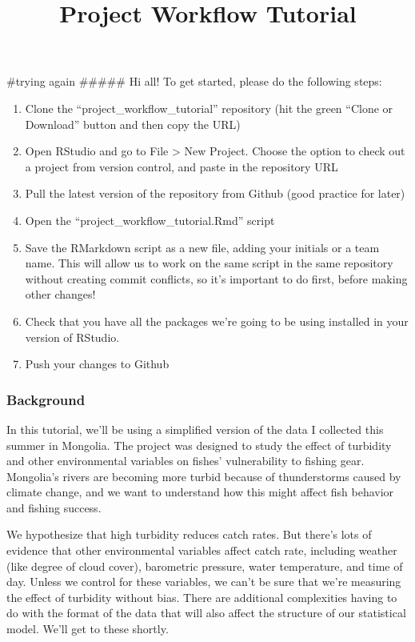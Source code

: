 \documentclass[]{article}
\title{Project Workflow Tutorial}
\author{}
\date{}
\providecommand{\tightlist}{%
  \setlength{\itemsep}{0pt}\setlength{\parskip}{0pt}}
\begin{document}
\maketitle

\#trying again \#\#\#\#\# Hi all! To get started, please do the
following steps:

\begin{enumerate}
\def\labelenumi{\arabic{enumi}.}
\tightlist
\item
  Clone the ``project\_workflow\_tutorial'' repository (hit the green
  ``Clone or Download'' button and then copy the URL)
\item
  Open RStudio and go to File \textgreater{} New Project. Choose the
  option to check out a project from version control, and paste in the
  repository URL
\item
  Pull the latest version of the repository from Github (good practice
  for later)
\item
  Open the ``project\_workflow\_tutorial.Rmd'' script
\item
  Save the RMarkdown script as a new file, adding your initials or a
  team name. This will allow us to work on the same script in the same
  repository without creating commit conflicts, so it's important to do
  first, before making other changes!
\item
  Check that you have all the packages we're going to be using installed
  in your version of RStudio.
\item
  Push your changes to Github
\end{enumerate}

\hypertarget{background}{%
\subsubsection{Background}\label{background}}

In this tutorial, we'll be using a simplified version of the data I
collected this summer in Mongolia. The project was designed to study the
effect of turbidity and other environmental variables on fishes'
vulnerability to fishing gear. Mongolia's rivers are becoming more
turbid because of thunderstorms caused by climate change, and we want to
understand how this might affect fish behavior and fishing success.

We hypothesize that high turbidity reduces catch rates. But there's lots
of evidence that other environmental variables affect catch rate,
including weather (like degree of cloud cover), barometric pressure,
water temperature, and time of day. Unless we control for these
variables, we can't be sure that we're measuring the effect of turbidity
without bias. There are additional complexities having to do with the
format of the data that will also affect the structure of our
statistical model. We'll get to these shortly.
\end{document}
